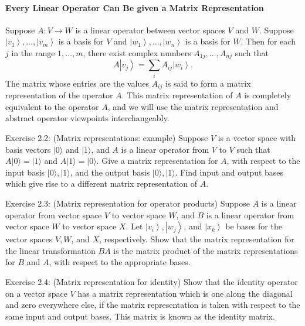 \paragraph{Every Linear Operator Can Be given a Matrix Representation}
Suppose $A: V \rightarrow W$ is a linear operator between vector spaces $V$ and $W$. Suppose $\left|v_{1}\right\rangle, \ldots,\left|v_{m}\right\rangle$ is a basis for $V$ and $\left|w_{1}\right\rangle, \ldots,\left|w_{n}\right\rangle$ is a basis for $W$. Then for each $j$ in the range $1, \ldots, m$, there exist complex numbers $A_{1 j}, \dots, A_{n j}$ such that
\begin{equation}
    A\left|v_{j}\right\rangle=\sum_{i} A_{i j}\left|w_{i}\right\rangle.
\end{equation}
The matrix whose entries are the values $A_{i j}$ is said to form a matrix representation of the operator $A$. This matrix representation of $A$ is completely equivalent to the operator $A$, and we will use the matrix representation and abstract operator viewpoints interchangeably. 



\begin{exercise}
Exercise 2.2: (Matrix representations: example) Suppose $V$ is a vector space with basis vectors $|0\rangle$ and $|1\rangle$, and $A$ is a linear operator from $V$ to $V$ such that $A|0\rangle=|1\rangle$ and $A|1\rangle=|0\rangle$. Give a matrix representation for $A$, with respect to the input basis $|0\rangle,|1\rangle$, and the output basis $|0\rangle,|1\rangle$. Find input and output bases which give rise to a different matrix representation of $A$.
\end{exercise}

\begin{exercise}
Exercise 2.3: (Matrix representation for operator products) Suppose $A$ is a linear operator from vector space $V$ to vector space $W$, and $B$ is a linear operator from vector space $W$ to vector space $X$. Let $\left|v_{i}\right\rangle,\left|w_{j}\right\rangle$, and $\left|x_{k}\right\rangle$ be bases for the vector spaces $V, W$, and $X$, respectively. Show that the matrix representation for the linear transformation $B A$ is the matrix product of the matrix representations for $B$ and $A$, with respect to the appropriate bases.
\end{exercise}

\begin{exercise}
Exercise 2.4: (Matrix representation for identity) Show that the identity operator on a vector space $V$ has a matrix representation which is one along the diagonal and zero everywhere else, if the matrix representation is taken with respect to the same input and output bases. This matrix is known as the identity matrix.
\end{exercise}